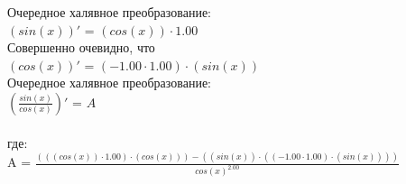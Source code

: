 \documentclass{article}
\begin{document}
Очередное халявное преобразование:\n\n
\\$(sin(x))'$ = $(cos(x)) \cdot 1.00$\\Совершенно очевидно, что\n\n
\\$(cos(x))'$ = $(-1.00 \cdot 1.00) \cdot (sin(x))$\\Очередное халявное преобразование:\n\n
\\$(\frac{sin(x)}{cos(x)})'$ = $A$\\\\ где:\\
A = $\frac{(((cos(x)) \cdot 1.00) \cdot (cos(x))) - ((sin(x)) \cdot ((-1.00 \cdot 1.00) \cdot (sin(x))))}{{cos(x)}^{2.00}}$\\
\end{document}
